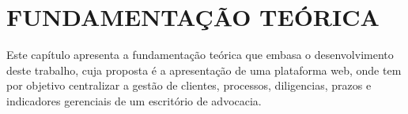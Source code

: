 \chapter{FUNDAMENTAÇÃO TEÓRICA} 

   Este capítulo apresenta a fundamentação teórica que embasa o desenvolvimento deste trabalho, cuja proposta é a apresentação de 
uma plataforma web, onde tem por objetivo centralizar a gestão de clientes, processos, diligencias, prazos e indicadores 
gerenciais de um escritório de advocacia.
